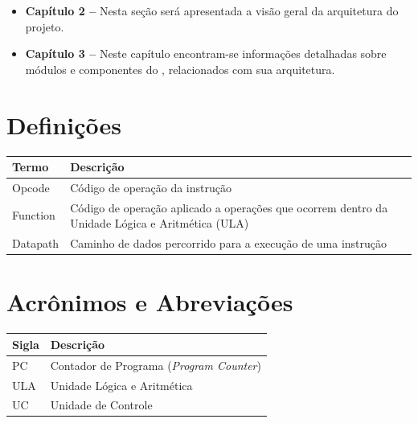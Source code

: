 \documentclass{report}
\begin{document}
  \begin{itemize}
  	\item \textbf{Capítulo 2 --} Nesta seção será apresentada a visão geral da arquitetura do projeto.
  	\item \textbf{Capítulo 3 --} Neste capítulo encontram-se informações detalhadas sobre módulos e componentes do \ipPROCESSProject, relacionados com sua arquitetura.
  \end{itemize}


  \section{Definições}
    \FloatBarrier
    \begin{table}[H]
      \begin{center}
        \begin{tabular}[pos]{|m{5cm} | m{9cm}|} 
          \hline
          \cellcolor[gray]{0.9}\textbf{Termo} & \cellcolor[gray]{0.9}\textbf{Descrição} \\ \hline
           Opcode   & Código de operação da instrução \\ \hline
           Function & Código de operação aplicado a operações que ocorrem dentro da Unidade Lógica e Aritmética (ULA)  \\ \hline
           Datapath & Caminho de dados percorrido para a execução de uma instrução \\ \hline
        \end{tabular}
      \end{center}
    \end{table}  

  \section{Acrônimos e Abreviações}
    \FloatBarrier
    \begin{table}[H]
      \begin{center}
        \begin{tabular}[pos]{|m{2cm} | m{12cm}|} 
          \hline
          \cellcolor[gray]{0.9}\textbf{Sigla} & \cellcolor[gray]{0.9}\textbf{Descrição} \\ \hline
             PC       &  Contador de Programa (\textit{Program Counter})\\ \hline
             ULA      &  Unidade Lógica e Aritmética\\ \hline
             UC      &  Unidade de Controle\\ \hline
        \end{tabular}
      \end{center}
    \end{table}  
\end{document}
